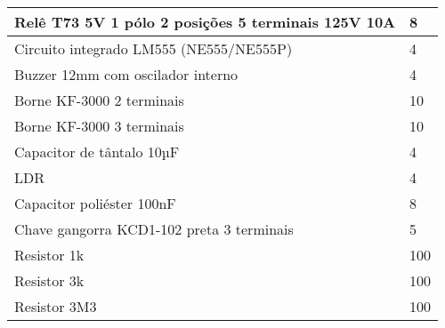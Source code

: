 \begin{tabular}{|l|l|}
Relê T73 5V 1 pólo 2 posições 5 terminais 125V 10A     & 8                   \\ \hline
Circuito integrado LM555 (NE555/NE555P)                & 4                   \\ \hline
Buzzer 12mm com oscilador interno                      & 4                   \\ \hline
Borne KF-3000 2 terminais                              & 10                  \\ \hline
Borne KF-3000 3 terminais                              & 10                  \\ \hline
Capacitor de tântalo 10µF                              & 4                   \\ \hline
LDR                                                    & 4                   \\ \hline
Capacitor poliéster 100nF                              & 8                   \\ \hline
Chave gangorra KCD1-102 preta 3 terminais              & 5                   \\ \hline
Resistor 1k                                            & 100                 \\ \hline
Resistor 3k                                            & 100                 \\ \hline
Resistor 3M3                                           & 100                 \\ \hline
\end{tabular}
